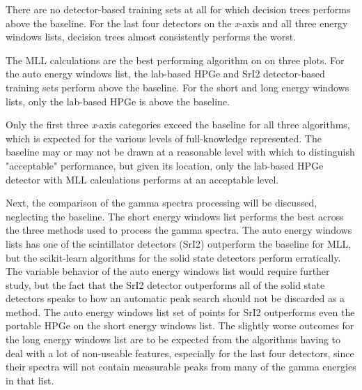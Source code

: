 There are no detector-based training sets at all for which decision trees
performs above the baseline. For the last four detectors on the \textit{x}-axis
and all three energy windows lists, decision trees almost consistently performs
the worst. 

The \gls{MLL} calculations are the best performing algorithm on on three plots.
For the auto energy windows list, the lab-based \gls{HPGe} and \gls{SrI2}
detector-based training sets perform above the baseline. For the short and long
energy windows lists, only the lab-based \gls{HPGe} is above the baseline. 

Only the first three \textit{x}-axis categories exceed the baseline for all
three algorithms, which is expected for the various levels of full-knowledge
represented. The baseline may or may not be drawn at a reasonable level with
which to distinguish "acceptable" performance, but given its location, only the
lab-based \gls{HPGe} detector with \gls{MLL} calculations performs at an
acceptable level.

Next, the comparison of the gamma spectra processing will be discussed,
neglecting the baseline.  The short energy windows list performs the best
across the three methods used to process the gamma spectra. The auto energy
windows lists has one of the scintillator detectors (\gls{SrI2}) outperform the
baseline for \gls{MLL}, but the scikit-learn algorithms for the solid state
detectors perform erratically.  The variable behavior of the auto energy
windows list would require further study, but the fact that the \gls{SrI2}
detector outperforms all of the solid state detectors speaks to how an
automatic peak search should not be discarded as a method.  The auto energy
windows list set of points for \gls{SrI2} outperforms even the portable
\gls{HPGe} on the short energy windows list.  The slightly worse outcomes for
the long energy windows list are to be expected from the algorithms having to
deal with a lot of non-useable features, especially for the last four
detectors, since their spectra will not contain measurable peaks from many of
the gamma energies in that list. 

